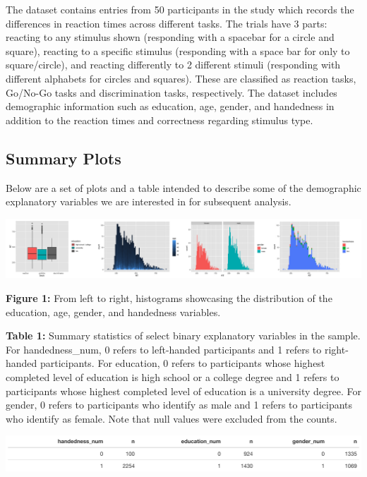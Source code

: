 \documentclass[
]{article}
\begin{document}
The dataset contains entries from 50 participants in the study which
records the differences in reaction times across different tasks. The
trials have 3 parts: reacting to any stimulus shown (responding with a
spacebar for a circle and square), reacting to a specific stimulus
(responding with a space bar for only to square/circle), and reacting
differently to 2 different stimuli (responding with different alphabets
for circles and squares). These are classified as reaction tasks,
Go/No-Go tasks and discrimination tasks, respectively. The dataset
includes demographic information such as education, age, gender, and
handedness in addition to the reaction times and correctness regarding
stimulus type.

\hypertarget{summary-plots}{%
\subsection{Summary Plots}\label{summary-plots}}

Below are a set of plots and a table intended to describe some of the
demographic explanatory variables we are interested in for subsequent
analysis.

\begin{center}\includegraphics[width=5.75in]{Introduction_Plots} \end{center}

\textbf{Figure 1:} From left to right, histograms showcasing the
distribution of the education, age, gender, and handedness variables.

\textbf{Table 1:} Summary statistics of select binary explanatory
variables in the sample. For handedness\_num, 0 refers to left-handed
participants and 1 refers to right-handed participants. For education, 0
refers to participants whose highest completed level of education is
high school or a college degree and 1 refers to participants whose
highest completed level of education is a university degree. For gender,
0 refers to participants who identify as male and 1 refers to
participants who identify as female. Note that null values were excluded
from the counts.

\begin{center}\includegraphics[width=6.15in]{Introduction_Summary_Table} \end{center}
\end{document}
